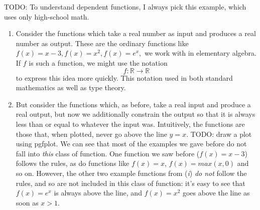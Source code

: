 \documentclass[11pt]{article} %
\theoremstyle{definition}
\theoremstyle{remark}
\begin{document}
TODO:
To understand dependent functions, I always pick this example, which uses only high-school math.
\begin{enumerate}[label=\textit{\roman*})]
\item
  Consider the functions which take a real number as input and produces a real number as output.
  These are the ordinary functions like $f(x) = x - 3, f(x) = x^2, f(x) = e^x, $ we work with in elementary algebra.
  If $f$ is such a function, we might use the notation $$f : \mathbb R \to \mathbb R$$ to express this idea more quickly.
  This notation used in both standard mathematics as well as type theory.
\item
  But consider the functions which, as before, take a real input and produce a real output, but now we additionally constrain the output so that it is always less than or equal to whatever the input was.
  Intuitively, the functions are those that, when plotted, never go above the line $y = x$.
  TODO: draw a plot using pgfplot.
  We can see that most of the examples we gave before do not fall into \emph{this} class of function.
  One function we saw before ($f(x) = x - 3$) follows the rules, as do functions like $f(x) = x$, $f(x) = max(x, 0)$ and so on.
  However, the other two example functions from (\textit{i}) \emph{do not} follow the rules, and so are not included in this class of function:
    it's easy to see that $f(x) = e^x$ is always above the line, and $f(x) = x^2$ goes above the line as soon as $x > 1$.


\end{enumerate}
\end{document}
